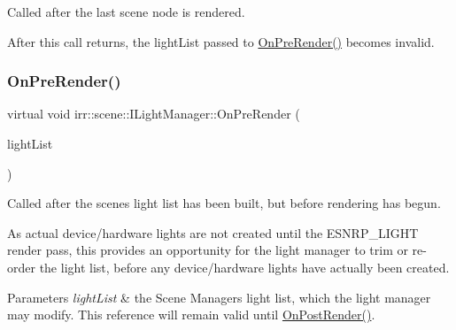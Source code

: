 Called after the last scene node is rendered. 

After this call returns, the light\+List passed to \hyperlink{classirr_1_1scene_1_1ILightManager_a07d93dbbdba50c7a26d1c293949e3781}{On\+Pre\+Render()} becomes invalid. \mbox{\label{classirr_1_1scene_1_1ILightManager_a07d93dbbdba50c7a26d1c293949e3781}} 
\subsubsection{\texorpdfstring{On\+Pre\+Render()}{OnPreRender()}\hspace{0.1cm}{\footnotesize\ttfamily [1/2]}}
{\footnotesize\ttfamily virtual void irr\+::scene\+::\+I\+Light\+Manager\+::\+On\+Pre\+Render (\begin{DoxyParamCaption}\item[{\hyperlink{classirr_1_1core_1_1array}{core\+::array}$<$ \hyperlink{classirr_1_1scene_1_1ISceneNode}{I\+Scene\+Node} $\ast$$>$ \&}]{light\+List }\end{DoxyParamCaption})\hspace{0.3cm}{\ttfamily [pure virtual]}}



Called after the scene\textquotesingle{}s light list has been built, but before rendering has begun. 

As actual device/hardware lights are not created until the E\+S\+N\+R\+P\+\_\+\+L\+I\+G\+HT render pass, this provides an opportunity for the light manager to trim or re-\/order the light list, before any device/hardware lights have actually been created. 
\begin{DoxyParams}{Parameters}
{\em light\+List} & the Scene Manager\textquotesingle{}s light list, which the light manager may modify. This reference will remain valid until \hyperlink{classirr_1_1scene_1_1ILightManager_ac8f92f0fbd43ba9cb01b47647125a1a3}{On\+Post\+Render()}. \\
\hline
\end{DoxyParams}
\mbox{\label{classirr_1_1scene_1_1ILightManager_a07d93dbbdba50c7a26d1c293949e3781}} 
